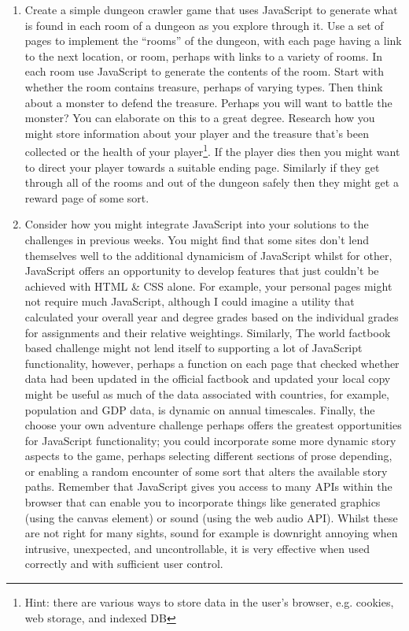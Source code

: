 \documentclass[10pt, a4paper, twosize]{article}
\begin{document}
\begin{enumerate}
\item Create a simple dungeon crawler game that uses JavaScript to generate what is found in each room of a dungeon as you explore through it. Use a set of pages to implement the ``rooms'' of the dungeon, with each page having a link to the next location, or room, perhaps with links to a variety of rooms. In each room use JavaScript to generate the contents of the room. Start with whether the room contains treasure, perhaps of varying types. Then think about a monster to defend the treasure. Perhaps you will want to battle the monster? You can elaborate on this to a great degree. Research how you might store information about your player and the treasure that's been collected or the health of your player\footnote{Hint: there are various ways to store data in the user's browser, e.g. cookies, web storage, and indexed DB}. If the player dies then you might want to direct your player towards a suitable ending page. Similarly if they get through all of the rooms and out of the dungeon safely then they might get a reward page of some sort.
\item Consider how you might integrate JavaScript into your solutions to the challenges in previous weeks. You might find that some sites don't lend themselves well to the additional dynamicism of JavaScript whilst for other, JavaScript offers an opportunity to develop features that just couldn't be achieved with HTML \& CSS alone. For example, your personal pages might not require much JavaScript, although I could imagine a utility that calculated your overall year and degree grades based on the individual grades for assignments and their relative weightings. Similarly, The world factbook based challenge might not lend itself to supporting a lot of JavaScript functionality, however, perhaps a function on each page that checked whether data had been updated in the official factbook and updated your local copy might be useful as much of the data associated with countries, for example, population and GDP data, is dynamic on annual timescales. Finally, the choose your own adventure challenge perhaps offers the greatest opportunities for JavaScript functionality; you could incorporate some more dynamic story aspects to the game, perhaps selecting different sections of prose depending, or enabling a random encounter of some sort that alters the available story paths. Remember that JavaScript gives you access to many APIs within the browser that can enable you to incorporate things like generated graphics (using the canvas element) or sound (using the web audio API). Whilst these are not right for many sights, sound for example is downright annoying when intrusive, unexpected, and uncontrollable, it is very effective when used correctly and with sufficient user control.
\end{enumerate}
\end{document}
